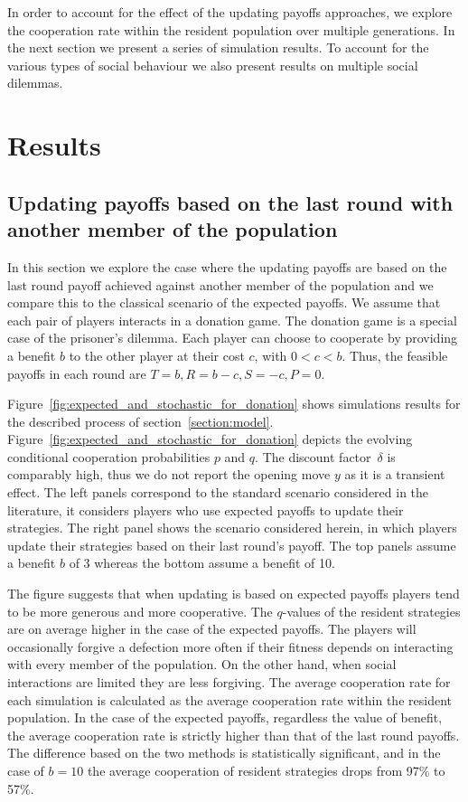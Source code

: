 \documentclass[11pt]{article}
\theoremstyle{plainCl1}
\theoremstyle{plainCl2}
\begin{document}
In order to account for the effect of the updating payoffs approaches, we
explore the cooperation rate within the resident population over multiple
generations. In the next section we present a series of simulation results.
To account for the various types of social behaviour we also present
results on multiple social dilemmas.


\section{Results}\label{section:results}
\subsection{Updating payoffs based on the last round with another member of the population}\label{section:donation}

In this section we explore the case where the updating payoffs are based on the
last round payoff achieved against another member of the population and we compare
this to the classical scenario of the expected payoffs. We assume that each pair
of players interacts in a donation game. The donation game is a special case of
the prisoner's dilemma. Each player can choose to cooperate by providing a
benefit \(b\) to the other player at their cost \(c\), with \(0 < c < b\).
Thus, the feasible payoffs in each round are \(T=b, R=b-c, S=-c, P=0\).

Figure~\ref{fig:expected_and_stochastic_for_donation} shows simulations results
for the described process of section~\ref{section:model}.
Figure~\ref{fig:expected_and_stochastic_for_donation} depicts the evolving
conditional cooperation probabilities $p$ and $q$. The discount factor~$\delta$
is comparably high, thus we do not report the opening move \(y\) as it
is a transient effect. The left panels correspond to the
standard scenario considered in the literature, it considers players who use
expected payoffs to update their strategies. The right panel shows the scenario
considered herein, in which players update their strategies based on their last
round’s payoff. The top panels assume a benefit \(b\) of 3 whereas the bottom
assume a benefit of 10.

The figure suggests that when updating is based on expected payoffs players
tend to be more generous and more cooperative. The $q$-values of the resident
strategies are on average higher in the case of the expected payoffs. The
players will occasionally forgive a defection more often if their fitness
depends on interacting with every member of the population. On the other hand,
when social interactions are limited they are less forgiving. The average
cooperation rate for each simulation is calculated as the average
cooperation rate within the resident population. In the case of the expected
payoffs, regardless the value of benefit, the average cooperation rate is
strictly higher than that of the last round payoffs. The difference based on the
two methods is statistically significant, and in the case of $b=10$ the
average cooperation of resident strategies drops from 97\% to 57\%.
\end{document}
